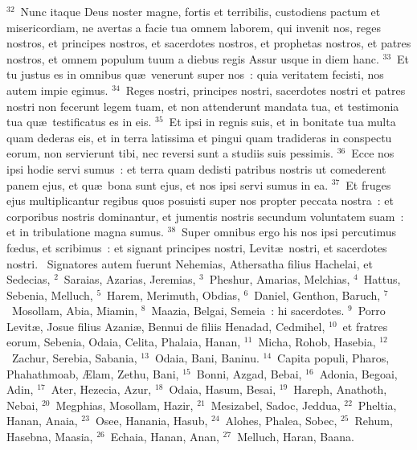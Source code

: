 ${}^{32}$~Nunc itaque Deus noster magne, fortis et terribilis, custodiens pactum et misericordiam, ne avertas a facie tua omnem laborem, qui invenit nos, reges nostros, et principes nostros, et sacerdotes nostros, et prophetas nostros, et patres nostros, et omnem populum tuum a diebus regis Assur usque in diem hanc.
${}^{33}$~Et tu justus es in omnibus qu\ae\ venerunt super nos~: quia veritatem fecisti, nos autem impie egimus.
${}^{34}$~Reges nostri, principes nostri, sacerdotes nostri et patres nostri non fecerunt legem tuam, et non attenderunt mandata tua, et testimonia tua qu\ae\ testificatus es in eis.
${}^{35}$~Et ipsi in regnis suis, et in bonitate tua multa quam dederas eis, et in terra latissima et pingui quam tradideras in conspectu eorum, non servierunt tibi, nec reversi sunt a studiis suis pessimis.
${}^{36}$~Ecce nos ipsi hodie servi sumus~: et terra quam dedisti patribus nostris ut comederent panem ejus, et qu\ae\ bona sunt ejus, et nos ipsi servi sumus in ea.
${}^{37}$~Et fruges ejus multiplicantur regibus quos posuisti super nos propter peccata nostra~: et corporibus nostris dominantur, et jumentis nostris secundum voluntatem suam~: et in tribulatione magna sumus.
${}^{38}$~Super omnibus ergo his nos ipsi percutimus fœdus, et scribimus~: et signant principes nostri, Levit\ae\ nostri, et sacerdotes nostri.
~\lettrine[lines=10,image=true,loversize=0.05,lraise=-0.03]{S}{}ignatores autem fuerunt Nehemias, Athersatha filius Hachelai, et Sedecias,
${}^{2}$~Saraias, Azarias, Jeremias,
${}^{3}$~Pheshur, Amarias, Melchias,
${}^{4}$~Hattus, Sebenia, Melluch,
${}^{5}$~Harem, Merimuth, Obdias,
${}^{6}$~Daniel, Genthon, Baruch,
${}^{7}$~Mosollam, Abia, Miamin,
${}^{8}$~Maazia, Belgai, Semeia~: hi sacerdotes.
${}^{9}$~Porro Levit\ae , Josue filius Azani\ae , Bennui de filiis Henadad, Cedmihel,
${}^{10}$~et fratres eorum, Sebenia, Odaia, Celita, Phalaia, Hanan,
${}^{11}$~Micha, Rohob, Hasebia,
${}^{12}$~Zachur, Serebia, Sabania,
${}^{13}$~Odaia, Bani, Baninu.
${}^{14}$~Capita populi, Pharos, Phahathmoab, \AE lam, Zethu, Bani,
${}^{15}$~Bonni, Azgad, Bebai,
${}^{16}$~Adonia, Begoai, Adin,
${}^{17}$~Ater, Hezecia, Azur,
${}^{18}$~Odaia, Hasum, Besai,
${}^{19}$~Hareph, Anathoth, Nebai,
${}^{20}$~Megphias, Mosollam, Hazir,
${}^{21}$~Mesizabel, Sadoc, Jeddua,
${}^{22}$~Pheltia, Hanan, Anaia,
${}^{23}$~Osee, Hanania, Hasub,
${}^{24}$~Alohes, Phalea, Sobec,
${}^{25}$~Rehum, Hasebna, Maasia,
${}^{26}$~Echaia, Hanan, Anan,
${}^{27}$~Melluch, Haran, Baana.


